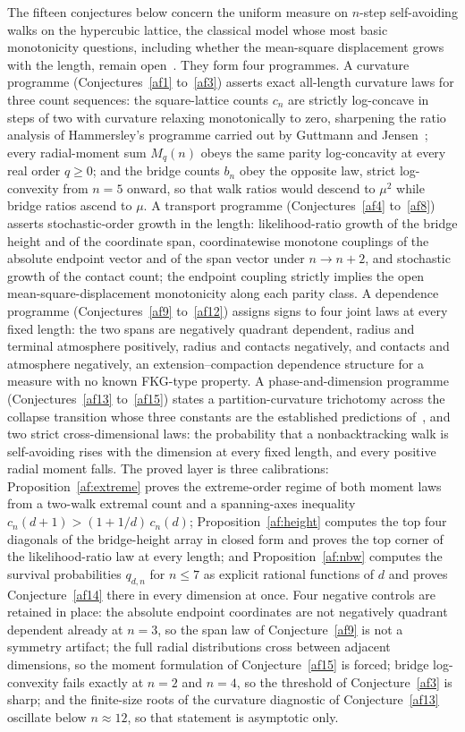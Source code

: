 \documentclass[11pt]{article}
\theoremstyle{definition}
\begin{document}
The fifteen conjectures below concern the uniform measure on $n$-step self-avoiding walks on the hypercubic lattice, the classical model whose most basic monotonicity questions, including whether the mean-square displacement grows with the length, remain open~\cite{MS93,BDGS12}.  They form four programmes.  A curvature programme (Conjectures~\ref{af1} to~\ref{af3}) asserts exact all-length curvature laws for three count sequences: the square-lattice counts $c_n$ are strictly log-concave in steps of two with curvature relaxing monotonically to zero, sharpening the ratio analysis of Hammersley's programme carried out by Guttmann and Jensen~\cite{GJ22}; every radial-moment sum $M_q(n)$ obeys the same parity log-concavity at every real order $q\ge0$; and the bridge counts $b_n$ obey the opposite law, strict log-convexity from $n=5$ onward, so that walk ratios would descend to $\mu^2$ while bridge ratios ascend to $\mu$.  A transport programme (Conjectures~\ref{af4} to~\ref{af8}) asserts stochastic-order growth in the length: likelihood-ratio growth of the bridge height and of the coordinate span, coordinatewise monotone couplings of the absolute endpoint vector and of the span vector under $n\to n+2$, and stochastic growth of the contact count; the endpoint coupling strictly implies the open mean-square-displacement monotonicity along each parity class.  A dependence programme (Conjectures~\ref{af9} to~\ref{af12}) assigns signs to four joint laws at every fixed length: the two spans are negatively quadrant dependent, radius and terminal atmosphere positively, radius and contacts negatively, and contacts and atmosphere negatively, an extension--compaction dependence structure for a measure with no known FKG-type property.  A phase-and-dimension programme (Conjectures~\ref{af13} to~\ref{af15}) states a partition-curvature trichotomy across the collapse transition whose three constants are the established predictions of~\cite{Nie82,DS87,OPB93}, and two strict cross-dimensional laws: the probability that a nonbacktracking walk is self-avoiding rises with the dimension at every fixed length, and every positive radial moment falls.  The proved layer is three calibrations: Proposition~\ref{af:extreme} proves the extreme-order regime of both moment laws from a two-walk extremal count and a spanning-axes inequality $c_n(d+1)>(1+1/d)\,c_n(d)$; Proposition~\ref{af:height} computes the top four diagonals of the bridge-height array in closed form and proves the top corner of the likelihood-ratio law at every length; and Proposition~\ref{af:nbw} computes the survival probabilities $q_{d,n}$ for $n\le7$ as explicit rational functions of $d$ and proves Conjecture~\ref{af14} there in every dimension at once.  Four negative controls are retained in place: the absolute endpoint coordinates are not negatively quadrant dependent already at $n=3$, so the span law of Conjecture~\ref{af9} is not a symmetry artifact; the full radial distributions cross between adjacent dimensions, so the moment formulation of Conjecture~\ref{af15} is forced; bridge log-convexity fails exactly at $n=2$ and $n=4$, so the threshold of Conjecture~\ref{af3} is sharp; and the finite-size roots of the curvature diagnostic of Conjecture~\ref{af13} oscillate below $n\approx12$, so that statement is asymptotic only.  
\end{document}
